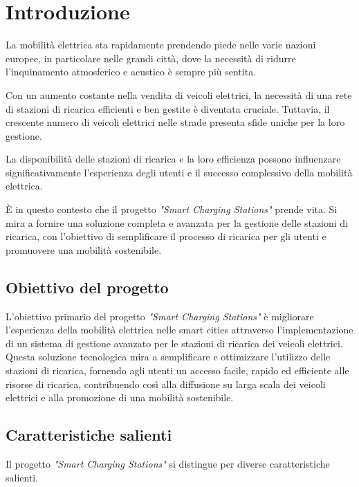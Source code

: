 

\section{Introduzione}
La mobilità elettrica sta rapidamente prendendo piede nelle varie nazioni europee, in particolare nelle grandi città,
dove la necessità di ridurre l'inquinamento atmosferico e acustico è sempre più sentita.

Con un aumento costante nella vendita di veicoli elettrici, la necessità di una rete
di stazioni di ricarica efficienti e ben gestite è diventata cruciale. Tuttavia,
il crescente numero di veicoli elettrici nelle strade presenta sfide uniche per la loro gestione.

La disponibilità delle stazioni di ricarica e la loro efficienza possono influenzare
significativamente l'esperienza degli utenti e il successo complessivo della mobilità elettrica.

È in questo contesto che il progetto \textit{"Smart Charging Stations"} prende vita. Si mira a
fornire una soluzione completa e avanzata per la gestione delle stazioni di ricarica, con
l'obiettivo di semplificare il processo di ricarica per gli utenti e promuovere una mobilità sostenibile.
\subsection{Obiettivo del progetto}
L'obiettivo primario del progetto \textit{"Smart Charging Stations"} è migliorare l'esperienza della
mobilità elettrica nelle smart cities attraverso l'implementazione di un sistema di gestione avanzato
per le stazioni di ricarica dei veicoli elettrici. Questa soluzione tecnologica mira a semplificare e
ottimizzare l'utilizzo delle stazioni di ricarica, fornendo agli utenti un accesso facile, rapido ed
efficiente alle risorse di ricarica, contribuendo così alla diffusione su larga scala dei veicoli elettrici
e alla promozione di una mobilità sostenibile.

\subsection{Caratteristiche salienti}
Il progetto \textit{"Smart Charging Stations"} si distingue per diverse caratteristiche salienti.

